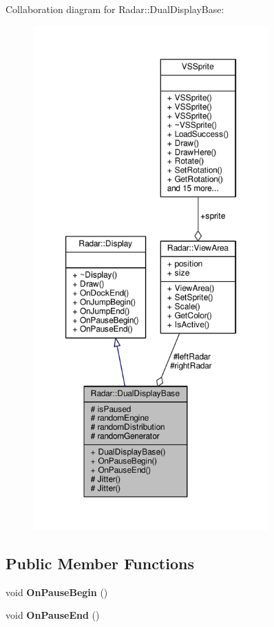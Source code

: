 Collaboration diagram for Radar\+:\+:Dual\+Display\+Base\+:
\nopagebreak
\begin{figure}[H]
\begin{center}
\leavevmode
\includegraphics[height=550pt]{d0/db5/classRadar_1_1DualDisplayBase__coll__graph}
\end{center}
\end{figure}
\subsection*{Public Member Functions}
\begin{DoxyCompactItemize}
\item 
void {\bfseries On\+Pause\+Begin} ()\hypertarget{classRadar_1_1DualDisplayBase_a267eeaed0d2762cfefb2cff38af85120}{}\label{classRadar_1_1DualDisplayBase_a267eeaed0d2762cfefb2cff38af85120}

\item 
void {\bfseries On\+Pause\+End} ()\hypertarget{classRadar_1_1DualDisplayBase_a16c5124d5c055823b4c9cf7189c87803}{}\label{classRadar_1_1DualDisplayBase_a16c5124d5c055823b4c9cf7189c87803}

\end{DoxyCompactItemize}
